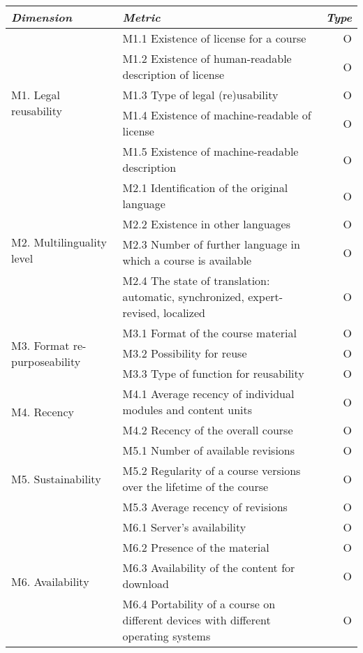 \documentclass{sig-alternate}
\theoremstyle{definition}
\begin{document}
\begin{table*}[tb!]
\scriptsize
\centering
\begin{tabular}{p{3.5cm}p{10.5cm}r}
\hline
\emph{Dimension} & \emph{Metric} & \emph{Type} \\ \hline
\multirow{5}{3cm}{M1. Legal reusability} & {\small M1.1 Existence of license for a course} & O \\
& {\small M1.2 Existence of human-readable description of license} & O \\
& {\small M1.3 Type of legal (re)usability} & O \\
& {\small M1.4 Existence of machine-readable of license} & O \\
& {\small M1.5 Existence of machine-readable description} & O \\	
\hline
\multirow{4}{*}{M2. Multilinguality level} & {\small M2.1 Identification of the original language} & O \\
& {\small M2.2 Existence in other languages} & O \\	
& {\small M2.3 Number of further language in which a course is available} & O \\
& {\small M2.4 The state of translation: automatic, synchronized, expert-revised, localized} & O \\
\hline
\multirow{3}{*}{M3. Format re-purposeability} & {\small M3.1 Format of the course material} & O \\
& {\small M3.2 Possibility for reuse} & O \\	
& {\small M3.3 Type of function for reusability} & O \\
\hline
\multirow{2}{*}{M4. Recency} & {\small M4.1 Average recency of individual modules and content units} & O \\
& {\small M4.2 Recency of the overall course} & O \\
\hline
\multirow{3}{*}{M5. Sustainability} & {\small M5.1 Number of available revisions} & O \\
& {\small M5.2 Regularity of a course versions over the lifetime of the course} & O \\
& {\small M5.3 Average recency of revisions} & O \\
\hline
\multirow{5}{*}{M6. Availability} & {\small M6.1 Server’s availability} & O \\
& {\small M6.2 Presence of the material} & O \\
& {\small M6.3 Availability of the content for download} & O \\
& {\small M6.4 Portability of a course on different devices with different operating systems} & O \\

\end{tabular}
\end{table*}
\end{document}
